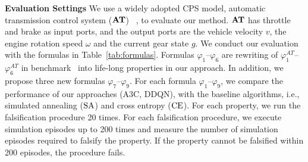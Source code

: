 \vspace{4mm}
\noindent \textbf{Evaluation Settings}
We use a widely adopted CPS model, automatic transmission control system ($\mathbf{AT}$) ~\cite{bardh2014benchmarks}, to evaluate our method.
%
%
$\mathbf{AT}$ has throttle and brake as input ports, and the output ports are the vehicle velocity $v$, the engine rotation speed $\omega$ and the current gear state $g$.
%
We conduct our evaluation with the formulas in Table~\ref{tab:formulas}.
Formulas $\varphi_1$--$\varphi_6$ are rewriting of  $\varphi^{AT}_1$--$\varphi^{AT}_6$ in benchmark~\cite{bardh2014benchmarks} into life-long properties in our approach.
In addition, we propose three new formulas $\varphi_{7}$--$\varphi_{9}$.
%
For each formula $\varphi_1$--$\varphi_9$, we compare the performance of our approaches (A3C, DDQN), with the baseline algorithms, i.e., simulated annealing ($\mathrm{SA}$) and cross entropy ($\mathrm{CE}$).
%
For each property, we run the falsification procedure 20 times.
For each falsification procedure, we execute simulation episodes up to 200 times and measure the number of simulation episodes required to falsify the property.
If the property cannot be falsified within 200 episodes, the procedure fails.
%
